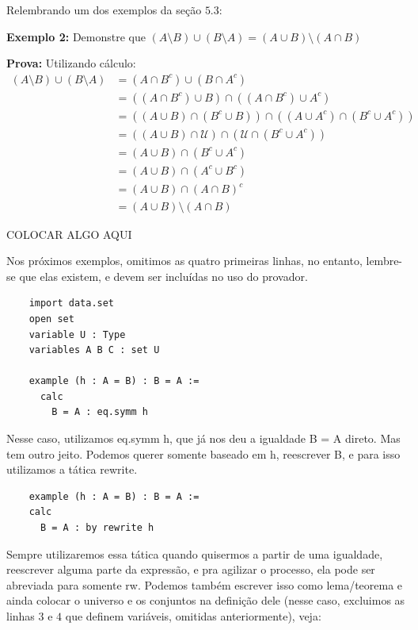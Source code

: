   Relembrando um dos exemplos da seção $5.3$:

  \textbf{Exemplo 2:} Demonstre que $(A \setminus B) \cup (B \setminus A) = (A \cup B) \setminus (A \cap B)$

  \textbf{Prova:} Utilizando cálculo:
  \begin{equation*}
    \begin{aligned}
      (A \setminus B) \cup (B \setminus A) &= (A \cap B^c) \cup (B \cap A^c)\\
      &= ((A \cap B^c) \cup B) \cap ((A \cap B^c) \cup A^c)\\
      &= ((A \cup B) \cap (B^c \cup B)) \cap ((A \cup A^c) \cap (B^c \cup A^c))\\
      &= ((A \cup B) \cap \mathcal U) \cap (\mathcal U \cap (B^c \cup A^c))\\
      &= (A \cup B) \cap (B^c \cup A^c)\\
      &= (A \cup B) \cap (A^c \cup B^c)\\
      &= (A \cup B) \cap (A \cap B)^c\\
      &= (A \cup B) \setminus (A \cap B)
    \end{aligned}
  \end{equation*}

COLOCAR ALGO AQUI

Nos próximos exemplos, omitimos as quatro primeiras linhas, no entanto, lembre-se que elas existem, e devem ser incluídas no uso do provador.

\begin{lstlisting}
    import data.set
    open set
    variable U : Type
    variables A B C : set U

    example (h : A = B) : B = A :=
      calc
        B = A : eq.symm h
\end{lstlisting}

Nesse caso, utilizamos {\selectfont eq.symm h}, que já nos deu a igualdade {\selectfont B = A} direto. Mas tem outro jeito. Podemos querer somente baseado em {\selectfont h}, reescrever {\selectfont B}, e para isso utilizamos a tática {\selectfont rewrite}.

  \begin{lstlisting}
    example (h : A = B) : B = A :=
    calc
      B = A : by rewrite h \end{lstlisting}

  Sempre utilizaremos essa tática quando quisermos a partir de uma igualdade, reescrever alguma parte da expressão, e pra agilizar o processo, ela pode ser abreviada para somente {\selectfont rw}.
  Podemos também escrever isso como lema/teorema e ainda colocar o universo e os conjuntos na definição dele (nesse caso, excluimos as linhas $3$ e $4$ que definem variáveis, omitidas anteriormente), veja:


